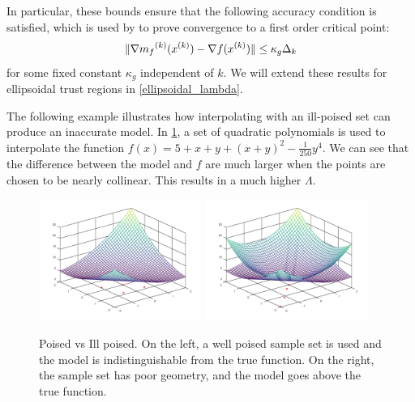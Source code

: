 In particular, these bounds ensure that the following accuracy condition is satisfied, which is used by \cite{Conejo:2013:GCT:2620806.2621814} to prove convergence to a first order critical point: 
\begin{equation}
\label{accuracy}
\|\nabla {{m}_f}^{(k)}({x}^{(k)}) - \nabla f({x}^{(k)}) \| \le \kappa_g \Delta_k
\end{equation}
 for some fixed constant $\kappa_g$ independent of $k$.
We will extend these results for ellipsoidal trust regions in \cref{ellipsoidal_lambda}.
 

The following example illustrates how interpolating with an ill-poised set can produce an inaccurate model.
In \cref{pvip}, a set of quadratic polynomials is used to interpolate the function $f(x) = 5 + x + y + (x + y) ^ 2 - \frac 1 {250} y ^ 4$.
We can see that the difference between the model and $f$ are much larger when the points are chosen to be nearly collinear.
This results in a much higher $\Lambda$.

\begin{figure}[h]
    \centering
    \includegraphics[width=200px]{images/poised_good.png}
    \includegraphics[width=200px]{images/poised_bad.png}
    \caption{
		Poised vs Ill poised.
		On the left, a well poised sample set is used and the model is indistinguishable from the true function.
		On the right, the sample set has poor geometry, and the model goes above the true function.
	}
    \label{pvip}
\end{figure}


